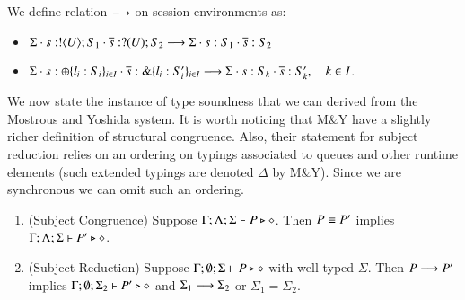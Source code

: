 \begin{definition}
	We define relation $\longrightarrow$ on session environments as:
	\begin{itemize}
		\item	$\Sigma \cdot s: ! \langle U \rangle ; S_1 \cdot \overline{s}: ? (U) ; S_2 \longrightarrow \Sigma \cdot s: S_1 \cdot \overline{s}: S_2$
		\item	$\Sigma \cdot s: \oplus \{l_i: S_i\}_{i \in I} \cdot \overline{s}: \& \{l_i: S_i'\}_{i \in I} \longrightarrow \Sigma \cdot s: S_k \cdot \overline{s}: S_k', \quad k \in I$.
	\end{itemize}
\end{definition}

We now state the instance of type soundness that we can derived from the Mostrous and Yoshida system.
It is worth noticing that M\&Y have a slightly richer definition of structural congruence.
Also, their statement for subject reduction relies on an ordering on typings associated to queues and other 
runtime elements (such extended typings are denoted $\Delta$ by M\&Y).
Since we are synchronous we can omit such an ordering.

\begin{theorem}\label{t:sr}
	\begin{enumerate}[1.]
		\item	(Subject Congruence) Suppose $\Gamma; \Lambda; \Sigma \vdash P \triangleright \diamond$.
			Then $P \equiv P'$ implies $\Gamma; \Lambda; \Sigma \vdash P' \triangleright \diamond$.

		\item	(Subject Reduction) Suppose $\Gamma; \emptyset; \Sigma \vdash P \triangleright \diamond$
			with
			well-typed $\Sigma$.
			Then $P \longrightarrow P'$ implies $\Gamma; \emptyset; \Sigma_2  \vdash P' \triangleright \diamond$
			and $\Sigma_1 \longrightarrow \Sigma_2$ or $\Sigma_1 = \Sigma_2$.
	\end{enumerate}
\end{theorem}


